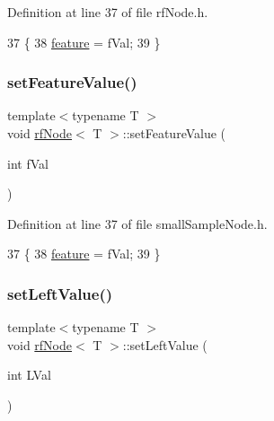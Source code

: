 Definition at line 37 of file rf\+Node.\+h.


\begin{DoxyCode}
37                                              \{
38             \hyperlink{classrfNode_ac8c0dd14a4e53f9b831f326f5d197e0e}{feature} = fVal;
39         \}
\end{DoxyCode}
\mbox{\label{classrfNode_a6a713bccdf5e59978075b0171bdaae73}} 
\subsubsection{\texorpdfstring{set\+Feature\+Value()}{setFeatureValue()}\hspace{0.1cm}{\footnotesize\ttfamily [2/2]}}
{\footnotesize\ttfamily template$<$typename T $>$ \\
void \hyperlink{classrfNode}{rf\+Node}$<$ T $>$\+::set\+Feature\+Value (\begin{DoxyParamCaption}\item[{int}]{f\+Val }\end{DoxyParamCaption})\hspace{0.3cm}{\ttfamily [inline]}}



Definition at line 37 of file small\+Sample\+Node.\+h.


\begin{DoxyCode}
37                                              \{
38             \hyperlink{classrfNode_ac8c0dd14a4e53f9b831f326f5d197e0e}{feature} = fVal;
39         \}
\end{DoxyCode}
\mbox{\label{classrfNode_a959c72aff3d20ca0552d2369e7d88188}} 
\subsubsection{\texorpdfstring{set\+Left\+Value()}{setLeftValue()}\hspace{0.1cm}{\footnotesize\ttfamily [1/2]}}
{\footnotesize\ttfamily template$<$typename T $>$ \\
void \hyperlink{classrfNode}{rf\+Node}$<$ T $>$\+::set\+Left\+Value (\begin{DoxyParamCaption}\item[{int}]{L\+Val }\end{DoxyParamCaption})\hspace{0.3cm}{\ttfamily [inline]}}



